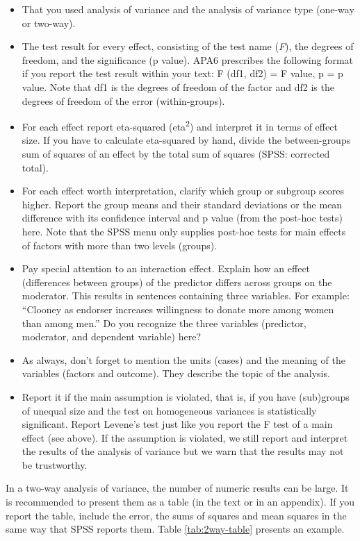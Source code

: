 \documentclass[a4paper]{book}
\theoremstyle{definition}
\theoremstyle{definition}
\theoremstyle{definition}
\theoremstyle{remark}
\begin{document}
\begin{itemize}
\item
  That you used analysis of variance and the analysis of variance type
  (one-way or two-way).
\item
  The test result for every effect, consisting of the test name
  (\emph{F}), the degrees of freedom, and the significance (p value).
  APA6 prescribes the following format if you report the test result
  within your text: F (df1, df2) = F value, p = p value. Note that df1
  is the degrees of freedom of the factor and df2 is the degrees of
  freedom of the error (within-groups).
\item
  For each effect report eta-squared (eta\textsuperscript{2}) and
  interpret it in terms of effect size. If you have to calculate
  eta-squared by hand, divide the between-groups sum of squares of an
  effect by the total sum of squares (SPSS: corrected total).
\item
  For each effect worth interpretation, clarify which group or subgroup
  scores higher. Report the group means and their standard deviations or
  the mean difference with its confidence interval and p value (from the
  post-hoc tests) here. Note that the SPSS menu only supplies post-hoc
  tests for main effects of factors with more than two levels (groups).
\item
  Pay special attention to an interaction effect. Explain how an effect
  (differences between groups) of the predictor differs across groups on
  the moderator. This results in sentences containing three variables.
  For example: ``Clooney as endorser increases willingness to donate
  more among women than among men.'' Do you recognize the three
  variables (predictor, moderator, and dependent variable) here?
\item
  As always, don't forget to mention the units (cases) and the meaning
  of the variables (factors and outcome). They describe the topic of the
  analysis.
\item
  Report it if the main assumption is violated, that is, if you have
  (sub)groups of unequal size and the test on homogeneous variances is
  statistically significant. Report Levene's test just like you report
  the F test of a main effect (see above). If the assumption is
  violated, we still report and interpret the results of the analysis of
  variance but we warn that the results may not be trustworthy.
\end{itemize}

In a two-way analysis of variance, the number of numeric results can be
large. It is recommended to present them as a table (in the text or in
an appendix). If you report the table, include the error, the sums of
squares and mean squares in the same way that SPSS reports them. Table
\ref{tab:2way-table} presents an example.
\end{document}
